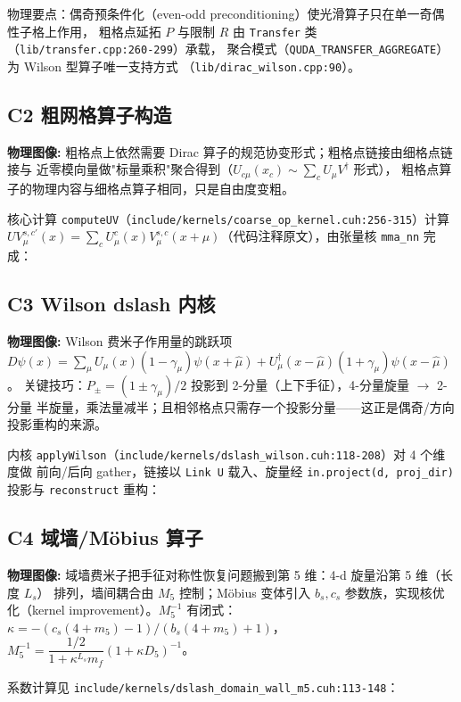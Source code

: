 \documentclass[UTF8]{ctexart}
\begin{document}
物理要点：偶奇预条件化（even-odd preconditioning）使光滑算子只在单一奇偶性子格上作用，
粗格点延拓 $P$ 与限制 $R$ 由 \texttt{Transfer} 类（\texttt{lib/transfer.cpp:260-299}）承载，
聚合模式（\texttt{QUDA\_TRANSFER\_AGGREGATE}）为 Wilson 型算子唯一支持方式
（\texttt{lib/dirac\_wilson.cpp:90}）。

\subsection{C2 粗网格算子构造}
\begin{physbox}
\textbf{物理图像:} 粗格点上依然需要 Dirac 算子的规范协变形式；粗格点链接由细格点链接与
近零模向量做"标量乘积"聚合得到（$U_{c\mu}(x_c) \sim \sum_c U_\mu V^\dagger$ 形式），
粗格点算子的物理内容与细格点算子相同，只是自由度变粗。
\end{physbox}
核心计算 \texttt{computeUV}（\texttt{\nolinkurl{include/kernels/coarse_op_kernel.cuh:256-315}}）计算
$UV^{s,c'}_\mu(x)=\sum_c U^c_\mu(x) V^{s,c}_\mu(x+\mu)$（代码注释原文），由张量核
\texttt{mma\_nn} 完成：


\subsection{C3 Wilson dslash 内核}
\begin{physbox}
\textbf{物理图像:} Wilson 费米子作用量的跳跃项 $D\psi(x)=\sum_\mu U_\mu(x)(1-\gamma_\mu)
\psi(x+\hat\mu)+U_\mu^\dagger(x-\hat\mu)(1+\gamma_\mu)\psi(x-\hat\mu)$。
关键技巧：$P_\pm=(1\pm\gamma_\mu)/2$ 投影到 2-分量（上下手征），4-分量旋量 $\to$ 2-分量
半旋量，乘法量减半；且相邻格点只需存一个投影分量——这正是偶奇/方向投影重构的来源。
\end{physbox}
内核 \texttt{applyWilson}（\texttt{\nolinkurl{include/kernels/dslash_wilson.cuh:118-208}}）对 4 个维度做
前向/后向 gather，链接以 \texttt{Link U} 载入、旋量经 \texttt{in.project(d, proj\_dir)}
投影与 \texttt{reconstruct} 重构：


\subsection{C4 域墙/Möbius 算子}
\begin{physbox}
\textbf{物理图像:} 域墙费米子把手征对称性恢复问题搬到第 5 维：4-d 旋量沿第 5 维（长度 $L_s$）
排列，墙间耦合由 $M_5$ 控制；Möbius 变体引入 $b_s,c_s$ 参数族，实现核优化（kernel
improvement）。$M_5^{-1}$ 有闭式：$\kappa=-(c_s(4+m_5)-1)/(b_s(4+m_5)+1)$，
$M_5^{-1}=\dfrac{1/2}{1+\kappa^{L_s}m_f}(1+\kappa D_5)^{-1}$。
\end{physbox}
系数计算见 \texttt{\nolinkurl{include/kernels/dslash_domain_wall_m5.cuh:113-148}}：

\end{document}
